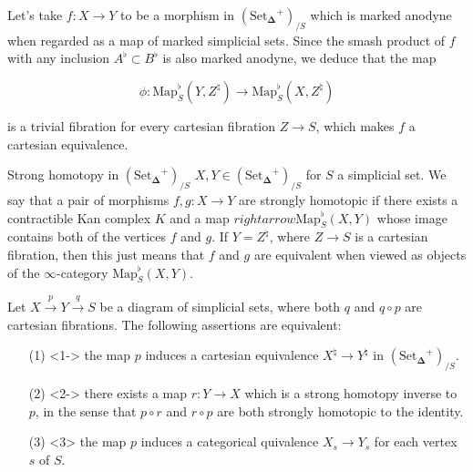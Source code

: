\documentclass{beamer}[9pt]
\newcommand{\8}{\ensuremath{\infty}}
\newcommand{\SSet}{\ensuremath{\text{Set}_{\boldsymbol{\Delta}}}}
\newcommand{\Map}{\ensuremath{\text{Map}}}
\begin{document}
\begin{frame}
  Let's take $f: X \rightarrow Y$ to be a morphism in $(\SSet^+)_{/S}$ which is marked anodyne when regarded as a map of marked simplicial sets. Since the smash product of $f$ with any inclusion $A^\flat\subset B^\flat$ is also marked anodyne, we deduce that the map

  $$
    \phi: \Map_S^\flat(Y, Z^\natural) \rightarrow \Map_S^\flat(X, Z^\natural)
  $$

  is a trivial fibration for every cartesian fibration $Z \rightarrow S$, which makes $f$ a cartesian equivalence.
\end{frame}

\begin{frame}{Strong homotopy in $(\SSet^+)_{/S}$}
  $X, Y \in (\SSet^+)_{/S}$ for $S$ a simplicial set. We say that a pair of morphisms $f, g: X \rightarrow Y$ are strongly homotopic if there exists a contractible Kan complex $K$ and a map $rightarrow \Map^\flat_S(X, Y)$ whose image contains both of the vertices $f$ and $g$. If $Y = Z^\natural$, where $Z \rightarrow S$ is a cartesian fibration, then this just means that $f$ and $g$ are equivalent when viewed as objects of the \8-category $\Map_S^\flat(X, Y)$.
\end{frame}

\begin{frame}
  Let $X \xrightarrow{p} Y \xrightarrow{q} S$ be a diagram of simplicial sets, where both $q$ and $q\circ p$ are cartesian fibrations. The following assertions are equivalent:

  \begin{itemize}
    \item[(1)]<1-> the map $p$ induces a cartesian equivalence $X^\natural \rightarrow Y^\natural$ in $(\SSet^+)_{/S}$.
    \item[(2)]<2-> there exists a map $r: Y \rightarrow X$ which is a strong homotopy inverse to $p$, in the sense that $p\circ r$ and $r\circ p$ are both strongly homotopic to the identity.
    \item[(3)]<3> the map $p$ induces a categorical quivalence $X_s \rightarrow Y_s$ for each vertex $s$ of $S$.
  \end{itemize}
\end{frame}
\end{document}
